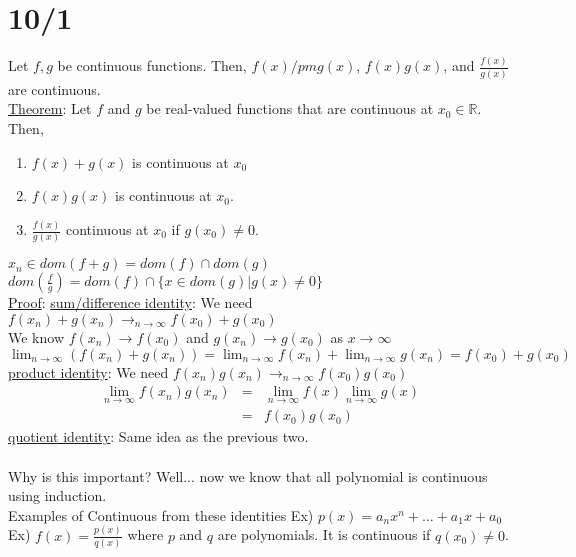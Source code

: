 \documentclass[11pt]{article}
\begin{document}
\section*{10/1}
	Let $f,g$ be continuous functions. Then, $f(x) /pm g(x)$, $f(x)g(x)$, and
	$\frac{f(x)}{g(x)}$ are continuous.\\
	\underline{Theorem}: Let $f$ and $g$ be real-valued functions that are
	continuous at $x_0 \in \mathbb{R}$. Then,
	\begin{enumerate}
		\item $f(x) + g(x)$ is continuous at $x_0$
		\item $f(x)g(x)$ is continuous at $x_0$.
		\item $\frac{f(x)}{g(x)}$ continuous at $x_0$ if $g(x_0) \not= 0$.
	\end{enumerate}
	$x_n \in dom(f+g) = dom(f) \cap dom(g)$\\
	$dom(\frac{f}{g}) = dom(f) \cap \{ x \in dom(g) | g(x) \not= 0\}$\\
	\underline{Proof}:
		\underline{sum/difference identity}:
		We need $f(x_n) + g(x_n) \to_{n \to \infty} f(x_0) + g(x_0)$\\
		We know $f(x_n) \to f(x_0)$ and $g(x_n) \to g(x_0)$ as $x \to \infty$\\
		$\lim_{n \to \infty}{(f(x_n) + g(x_n))} = \lim_{n \to \infty}{f(x_n)} +
		\lim_{n \to \infty}{g(x_n)} = f(x_0) + g(x_0)$\\
		\underline{product identity}:
			We need $f(x_n)g(x_n) \to_{n \to \infty} f(x_0)g(x_0)$\\
			\begin{eqnarray*}
				\lim_{n \to \infty}{f(x_n)g(x_n)} 
				& = & \lim_{n \to \infty}{f(x)}\lim_{n \to \infty}{g(x)}\\
				& = & f(x_0)g(x_0)
			\end{eqnarray*}
		\underline{quotient identity}:
			Same idea as the previous two.\\\\
		Why is this important? Well... now we know that all polynomial is 
		continuous using induction.\\
		Examples of Continuous from these identities
		Ex) $p(x) = a_nx^n + \ldots + a_1x + a_0$\\
		Ex) $f(x) = \frac{p(x)}{q(x)}$ where $p$ and $q$ are polynomials.
			It is continuous if $q(x_0) \not= 0$.\\\\
\end{document}
